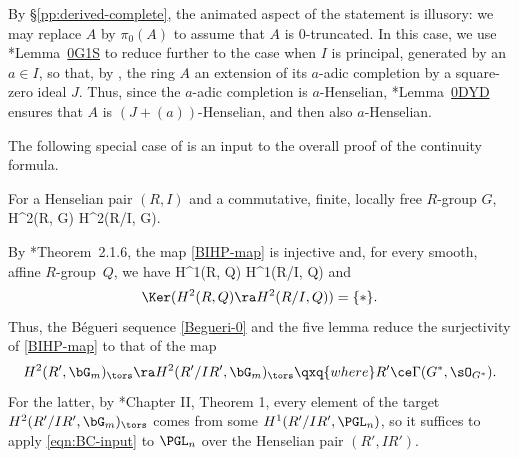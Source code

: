 \bpf
By \S\ref{pp:derived-complete},
the animated aspect of the statement is illusory: we may replace $A$ by $\pi_0(A)$ to assume that $A$ is $0$-truncated. In this case, we use \cite{SP}*{Lemma~\href{https://stacks.math.columbia.edu/tag/0G1S}{0G1S}} to reduce further to the case when $I$ is principal, generated by an $a \in I$, so that, by , the ring $A$ an extension of its $a$-adic completion by a square-zero ideal $J$.
Thus, since the $a$-adic completion %
is $a$-Henselian, \cite{SP}*{Lemma~\href{https://stacks.math.columbia.edu/tag/0DYD}{0DYD}} ensures that $A$ is $(J + (a))$-Henselian, and then also $a$-Henselian. %
\epf



The following special case of  is an input to the overall proof of the continuity formula.





\blem {}
For a Henselian pair $(R, I)$ and a commutative, finite, locally free $R$-group $G$,
\be {}
H^2(R, G) \isomto H^2(R/I, G).
\ee
\elem

\bpf
By \cite{BC19}*{Theorem~2.1.6}, the map \eqref{BIHP-map} is injective and, for every smooth, affine $R$-group~$Q$, we have
\be \label{eqn:BC-input}
H^1(R, Q) \isomto H^1(R/I, Q)
\ee
and
\[
\Ker(H^2(R, Q) \ra H^2(R/I, Q)) = \{*\}.
\]
Thus, the B\'{e}gueri sequence \eqref{Begueri-0} and the five lemma reduce the surjectivity of \eqref{BIHP-map} to that of the map
\[
H^2(R', \bG_m)_\tors \ra H^2(R'/IR', \bG_m)_\tors \qxq{where} R' \ce \Gamma(G^*, \sO_{G^*}).
\]
For the latter, by \cite{Gab81}*{Chapter II, Theorem 1}, every element of the target $H^2(R'/IR', \bG_m)_\tors$ comes from some $H^1(R'/IR', \PGL_n)$, so it suffices to apply \eqref{eqn:BC-input} to $\PGL_{n}$ over the Henselian pair $(R', IR')$.
\epf




